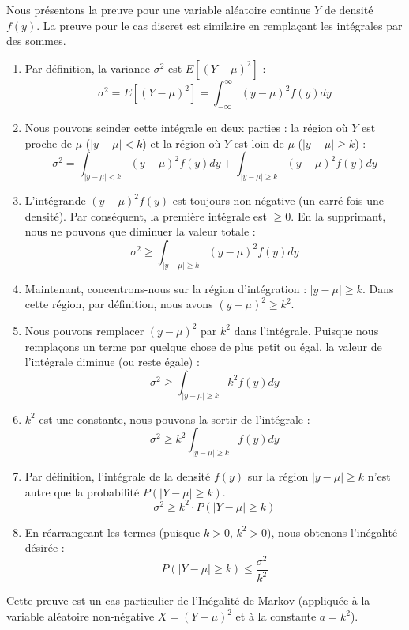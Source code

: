 \begin{proofbox}
Nous présentons la preuve pour une variable aléatoire continue $Y$ de densité $f(y)$. La preuve pour le cas discret est similaire en remplaçant les intégrales par des sommes.

\begin{enumerate}
    \item Par définition, la variance $\sigma^2$ est $E[(Y - \mu)^2]$ :
    $$ \sigma^2 = E[(Y - \mu)^2] = \int_{-\infty}^{\infty} (y - \mu)^2 f(y) dy $$
    
    \item Nous pouvons scinder cette intégrale en deux parties : la région où $Y$ est proche de $\mu$ ($|y - \mu| < k$) et la région où $Y$ est loin de $\mu$ ($|y - \mu| \ge k$) :
    $$ \sigma^2 = \int_{|y - \mu| < k} (y - \mu)^2 f(y) dy + \int_{|y - \mu| \ge k} (y - \mu)^2 f(y) dy $$
    
    \item L'intégrande $(y - \mu)^2 f(y)$ est toujours non-négative (un carré fois une densité). Par conséquent, la première intégrale est $\ge 0$. En la supprimant, nous ne pouvons que diminuer la valeur totale :
    $$ \sigma^2 \ge \int_{|y - \mu| \ge k} (y - \mu)^2 f(y) dy $$
    
    \item Maintenant, concentrons-nous sur la région d'intégration : $|y - \mu| \ge k$. Dans cette région, par définition, nous avons $(y - \mu)^2 \ge k^2$.
    
    \item Nous pouvons remplacer $(y - \mu)^2$ par $k^2$ dans l'intégrale. Puisque nous remplaçons un terme par quelque chose de plus petit ou égal, la valeur de l'intégrale diminue (ou reste égale) :
    $$ \sigma^2 \ge \int_{|y - \mu| \ge k} k^2 f(y) dy $$
    
    \item $k^2$ est une constante, nous pouvons la sortir de l'intégrale :
    $$ \sigma^2 \ge k^2 \int_{|y - \mu| \ge k} f(y) dy $$
    
    \item Par définition, l'intégrale de la densité $f(y)$ sur la région $|y - \mu| \ge k$ n'est autre que la probabilité $P(|Y - \mu| \ge k)$.
    $$ \sigma^2 \ge k^2 \cdot P(|Y - \mu| \ge k) $$
    
    \item En réarrangeant les termes (puisque $k > 0$, $k^2 > 0$), nous obtenons l'inégalité désirée :
    $$ P(|Y - \mu| \ge k) \le \frac{\sigma^2}{k^2} $$
\end{enumerate}
Cette preuve est un cas particulier de l'Inégalité de Markov (appliquée à la variable aléatoire non-négative $X = (Y-\mu)^2$ et à la constante $a = k^2$).
\end{proofbox}

